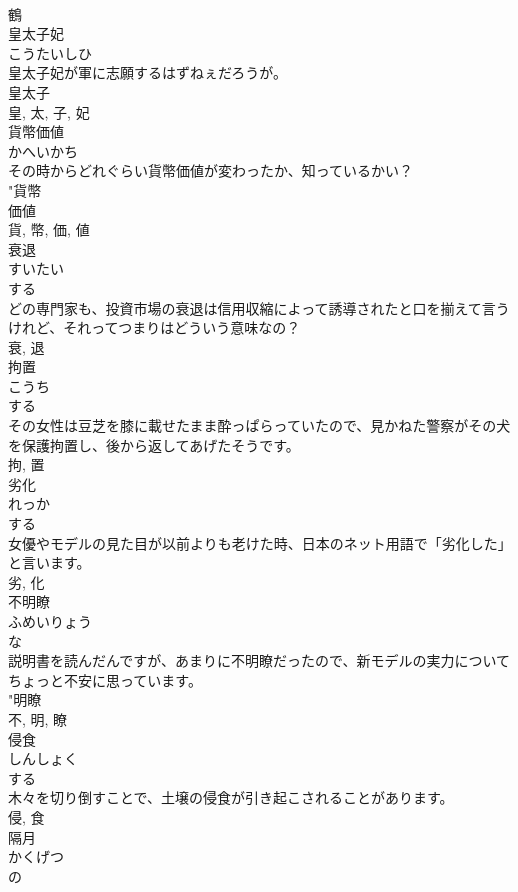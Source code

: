 \documentclass[8pt]{extreport}
\begin{document}
\begin{CJK}{UTF8}{min}
\\	鶴	
\\	皇太子妃	
\\	こうたいしひ	
\\	皇太子妃が軍に志願するはずねぇだろうが。	
\\	皇太子 
\\	皇, 太, 子, 妃	
\\	貨幣価値	
\\	かへいかち	
\\	その時からどれぐらい貨幣価値が変わったか、知っているかい？	
\\	"貨幣 
\\	価値 
\\	貨, 幣, 価, 値	
\\	衰退	
\\	すいたい	
\\	する 
\\	どの専門家も、投資市場の衰退は信用収縮によって誘導されたと口を揃えて言うけれど、それってつまりはどういう意味なの？	
\\	衰, 退	
\\	拘置	
\\	こうち	
\\	する 
\\	その女性は豆芝を膝に載せたまま酔っぱらっていたので、見かねた警察がその犬を保護拘置し、後から返してあげたそうです。	
\\	拘, 置	
\\	劣化	
\\	れっか	
\\	する 
\\	女優やモデルの見た目が以前よりも老けた時、日本のネット用語で「劣化した」と言います。	
\\	劣, 化	
\\	不明瞭	
\\	ふめいりょう	
\\	な 
\\	説明書を読んだんですが、あまりに不明瞭だったので、新モデルの実力についてちょっと不安に思っています。	
\\	"明瞭 
\\	不, 明, 瞭	
\\	侵食	
\\	しんしょく	
\\	する 
\\	木々を切り倒すことで、土壌の侵食が引き起こされることがあります。	
\\	侵, 食	
\\	隔月	
\\	かくげつ	
\\	の 

\end{CJK}
\end{document}
